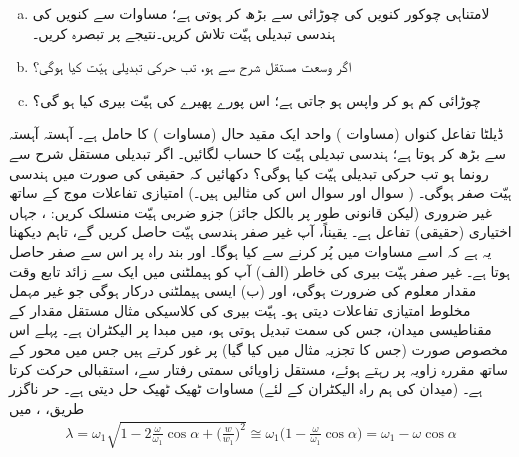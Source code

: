 \begin{enumerate}[a.]
\item
لامتناہی چوکور کنویں کی چوڑائی   سے بڑھ  کر  ہوتی ہے؛  مساوات  سے کنویں کی   ہندسی تبدیلی ہیّت تلاش کریں۔نتیجے پر تبصرہ کریں۔
\item
اگر وسعت مستقل شرح  سے  ہو،  تب حرکی تبدیلی ہیّت کیا ہوگی؟ 
\item
چوڑائی کم ہو کر  واپس  ہو جاتی ہے؛  اس پورے پھیرے کی ہیّت بیری کیا ہو گی؟ 
\end{enumerate}
ڈیلٹا تفاعل کنواں  (مساوات  )   واحد ایک مقید حال  (مساوات  )  کا حامل ہے۔   آہستہ آہستہ  سے بڑھ کر  ہوتا ہے؛ ہندسی تبدیلی ہیّت کا حساب لگائیں۔ اگر تبدیلی  مستقل شرح  سے رونما ہو تب حرکی تبدیلی ہیّت کیا ہوگی؟
دکھائیں کہ  حقیقی  کی صورت میں ہندسی ہیّت صفر ہوگی۔  ( سوال    اور سوال   اس کی مثالیں ہیں۔) امتیازی تفاعلات موج  کے ساتھ  غیر ضروری  (لیکن قانونی  طور پر بالکل جائز)  جزو ضربی ہیّت منسلک کریں: ،  جہاں   اختیاری  (حقیقی)  تفاعل ہے۔  یقیناً،  آپ غیر صفر ہندسی ہیّت حاصل کریں گے،  تاہم  دیکھنا یہ ہے کہ اسے مساوات    میں  پُر  کرنے سے کیا ہوگا۔ اور بند راہ پر اس سے  صفر حاصل ہوتا ہے۔   غیر صفر ہیّت بیری کی خاطر  (الف)  آپ کو  ہیملٹنی میں ایک سے زائد  تابع وقت مقدار معلوم کی ضرورت ہوگی،  اور (ب)    ایسی ہیملٹنی درکار ہوگی جو غیر  مہمل   مخلوط امتیازی تفاعلات دیتی  ہو۔ 
ہیّت بیری کی کلاسیکی مثال  مستقل مقدار کے  مقناطیسی میدان،  جس کی سمت تبدیل ہوتی ہو،  میں مبدا پر  الیکٹران ہے۔  پہلے اس مخصوص صورت (جس کا تجزیہ مثال     میں کیا گیا)   پر غور کرتے  ہیں   جس میں محور  کے ساتھ   مقررہ  زاویہ   پر رہتے ہوئے،   مستقل زاویائی  سمتی رفتار  سے،      استقبالی حرکت کرتا ہے۔ (میدان   کی ہم راہ   الیکٹران کے لئے)  مساوات  ٹھیک ٹھیک حل دیتی ہے۔ حر ناگزر  طریق،  ،  میں 
\begin{align}
\lambda = \omega_1 \sqrt{1 - 2 \frac{\omega}{\omega_1} \cos \alpha + \big ( \frac{w}{w_1} \big )^2 } \cong \omega_1 \big ( 1 - \frac{\omega}{\omega_1} \cos \alpha \big ) = \omega_1 - \omega \cos \alpha
\end{align}
